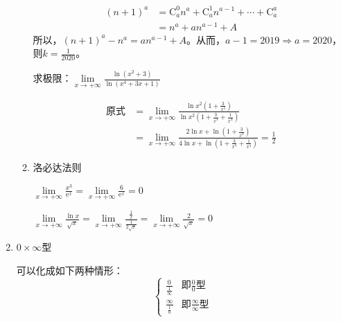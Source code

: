\begin{enumerate}
\begin{enumerate}
        \begin{solution}
            \begin{align*}
                (n+1)^a &=\mathrm{C}_a^0 n^a+\mathrm{C}_a^1 n^{a-1}+\cdots+\mathrm{C}_a^a\\
                &=n^a+an^{a-1}+A
            \end{align*}
            所以，$(n+1)^a-n^a=an^{a-1}+A$。从而，$a-1=2019 \Rightarrow a=2020$，则$k=\displaystyle\frac{1}{2020}$。
        \end{solution}

        \begin{example}
            求极限：$\lim\limits_{x \to +\infty}\displaystyle\frac{\ln (x^2+3)}{\ln(x^4+3x+1)}$
        \end{example}

        \begin{solution}
            \begin{align*}
                \text{原式}
                &=\lim_{x \to +\infty}\frac{\ln{x^2(1+\frac{3}{x^2})}}{\ln{x^2(1+\frac{3}{x^3}+\frac{1}{x^4})}}\\
                &=\lim_{x \to +\infty}\frac{2\ln x+\ln(1+\frac{3}{x^3})}{4\ln x+\ln(1+\frac{3}{x^3}+\frac{1}{x^4})}=\frac{1}{2}
            \end{align*}
        \end{solution}

        \item 洛必达法则
        \begin{example}
            $\lim\limits_{x \to +\infty}\displaystyle\frac{x^3}{\mathrm{e}^x}=\lim\limits_{x \to +\infty}\displaystyle\frac{6}{\mathrm{e}^x}=0$
        \end{example}

        \begin{example}
            $\lim\limits_{x \to +\infty}\displaystyle\frac{\ln x}{\sqrt{x}}=\lim\limits_{x \to +\infty}\displaystyle\frac{\frac{1}{x}}{\frac{1}{2\sqrt{x}}}=\lim\limits_{x \to +\infty}\displaystyle\frac{2}{\sqrt{x}}=0$
        \end{example}
        \end{enumerate}

        \item $0 \times \infty$型

        可以化成如下两种情形：
        \[ \left\{
                        \begin{array}{rl}
                             \frac{0}{\frac{1}{\infty}} &\text{即} \frac{0}{0}\text{型}\\
                             \frac{\infty}{\frac{1}{0}} &\text{即} \frac{\infty}{\infty}\text{型}
                        \end{array} \right. \]


\end{enumerate}
